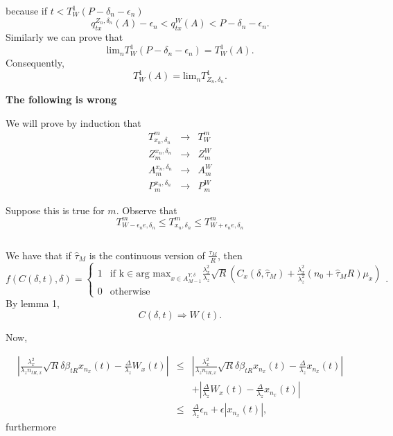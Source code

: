 \documentclass[11pt,english]{article}
\begin{document}
because if $t<T_{W}^{1}\left(P-\delta_{n}-\epsilon_{n}\right)$ 
\[
q_{tx}^{Z_{n},\delta_{n}}\left(A\right)-\epsilon_{n}<q_{tx}^{W}\left(A\right)<P-\delta_{n}-\epsilon_{n}.
\]
Similarly we can prove that 
\[
\mbox{lim}_{n}T_{W}^{1}\left(P-\delta_{n}-\epsilon_{n}\right)=T_{W}^{1}\left(A\right).
\]
Consequently,
\[
T_{W}^{1}\left(A\right)=\mbox{lim}_{n}T_{Z_{n},\delta_{n}}^{1}.
\]


\textbf{\large The following is wrong}{\large \par}

We will prove by induction that
\begin{eqnarray*}
T_{x_{n},\delta_{n}}^{m} & \rightarrow & T_{W}^{m}\\
Z_{m}^{x_{n},\delta_{n}} & \rightarrow & Z_{m}^{W}\\
A_{m}^{x_{n},\delta_{n}} & \rightarrow & A_{m}^{W}\\
P_{m}^{x_{n},\delta_{n}} & \rightarrow & P_{m}^{W}
\end{eqnarray*}


Suppose this is true for $m$. Observe that
\[
T_{W-\epsilon_{n}e,\delta_{n}}^{m}\leq T_{x_{n},\delta_{n}}^{m}\leq T_{W+\epsilon_{n}e,\delta_{n}}^{m}
\]


\[
\]


We have that if $\hat{\tau}_{M}$ is the continuous version of $\frac{\tau_{M}}{R}$,
then 
\[
f\left(C\left(\delta,t\right),\delta\right)=\begin{cases}
1 & \mbox{if }\mbox{k}\in\mbox{arg max}_{x\in A_{M-1}^{Y,\delta}}\frac{\lambda_{x}^{2}}{\lambda_{z}}\sqrt{R}\left(C_{x}\left(\delta,\hat{\tau}_{M}\right)+\frac{\lambda_{x}^{2}}{\lambda_{z}^{2}}\left(n_{0}+\hat{\tau}_{M}R\right)\mu_{x}\right)\\
0 & \mbox{otherwise}
\end{cases}.
\]
By lemma 1,
\[
C\left(\delta,t\right)\Rightarrow W\left(t\right).
\]


Now,

\begin{eqnarray*}
\left|\frac{\lambda_{x}^{2}}{\lambda_{z}n_{tR,x}}\sqrt{R}\delta\beta_{tR}x_{n_{x}}\left(t\right)-\frac{\Delta}{\lambda_{z}}W_{x}\left(t\right)\right| & \leq & \left|\frac{\lambda_{x}^{2}}{\lambda_{z}n_{tR,x}}\sqrt{R}\delta\beta_{tR}x_{n_{x}}\left(t\right)-\frac{\Delta}{\lambda_{z}}x_{n_{x}}\left(t\right)\right|\\
 &  & +\left|\frac{\Delta}{\lambda_{z}}W_{x}\left(t\right)-\frac{\Delta}{\lambda_{z}}x_{n_{x}}\left(t\right)\right|\\
 & \leq & \frac{\Delta}{\lambda_{z}}\epsilon_{n}+\epsilon\left|x_{n_{x}}\left(t\right)\right|,
\end{eqnarray*}
furthermore
\end{document}
